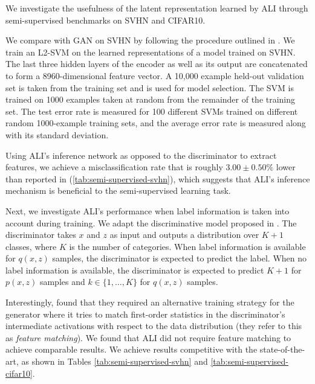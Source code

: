 \documentclass{article}
\begin{document}
We investigate the usefulness of the latent representation learned by ALI
through semi-supervised benchmarks on SVHN and CIFAR10.

We compare with GAN on SVHN by following the procedure outlined in
\citet{radford2015unsupervised}. We train an L2-SVM on the learned
representations of a model trained on SVHN. The last three hidden layers of the
encoder as well as its output are concatenated to form a 8960-dimensional
feature vector. A 10,000 example held-out validation set is taken from the
training set and is used for model selection. The SVM is trained on 1000
examples taken at random from the remainder of the training set. The test error
rate is measured for 100 different SVMs trained on different random 1000-example
training sets, and the average error rate is measured along with its standard
deviation.

Using ALI's inference network as opposed to the discriminator to extract
features, we achieve a misclassification rate that is roughly $3.00 \pm 0.50\%$
lower than reported in \citet{radford2015unsupervised}
(\autoref{tab:semi-supervised-svhn}), which suggests that ALI's inference
mechanism is beneficial to the semi-supervised learning task.

Next, we investigate ALI's performance when label information is taken into
account during training. We adapt the discriminative model proposed in
\citet{Salimans2016gan}. The discriminator takes $x$ and $z$ as input and
outputs a distribution over $K + 1$ classes, where $K$ is the number of
categories. When label information is available for $q(x, z)$ samples, the
discriminator is expected to predict the label. When no label information is
available, the discriminator is expected to predict $K + 1$ for $p(x, z)$ samples
and $k \in \{1, \ldots, K\}$ for $q(x, z)$ samples.

Interestingly, \citet{Salimans2016gan} found that they required an alternative
training strategy for the generator where it tries to match first-order
statistics in the discriminator's intermediate activations with respect to the
data distribution (they refer to this as {\em feature matching}). We found that
ALI did not require feature matching to achieve comparable results. We achieve
results competitive with the state-of-the-art, as shown in
Tables \ref{tab:semi-supervised-svhn} and \ref{tab:semi-supervised-cifar10}.
\end{document}
